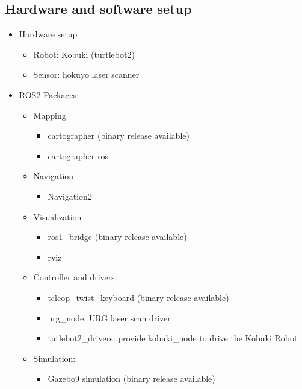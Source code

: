 \documentclass[letterpaper, 10 pt, conference]{ieeeconf}  %
\begin{document}
\subsection{Hardware and software setup}
\begin{itemize}
\item  Hardware setup 
    \begin{itemize}
        \item Robot: Kobuki (turtlebot2)
        \item Sensor: hokuyo laser scanner
    \end{itemize}{}
\end{itemize}

\begin{itemize}
\item ROS2 Packages:
    \begin{itemize}
        \item Mapping   
            \begin{itemize}
                \item cartographer (binary release available)
                \item cartographer-ros 
            \end{itemize}{}
    \end{itemize}{}
    \begin{itemize}
        \item Navigation
            \begin{itemize}
                \item Navigation2 
            \end{itemize}{}
    \end{itemize}{}
    \begin{itemize}
        \item Visualization
            \begin{itemize}
                \item ros1\_bridge (binary release available)
                \item rviz
            \end{itemize}{}
   
        \item Controller and drivers:
            \begin{itemize}
                \item teleop\_twist\_keyboard (binary release available)
                \item urg\_node: URG laser scan driver 
                \item tutlebot2\_drivers: provide kobuki\_node to drive the Kobuki Robot
            \end{itemize}{}
        \item Simulation:
            \begin{itemize}
                \item Gazebo9 simulation (binary release available)
            \end{itemize}{}
    \end{itemize}{} 
\end{itemize}{}
\end{document}
